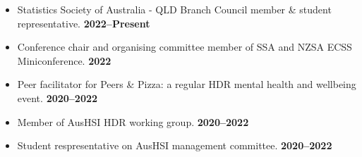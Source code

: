 \begin{itemize}
	\item Statistics Society of Australia - QLD Branch Council member \& student representative. \hfill\textbf{2022--Present}
	\item Conference chair and organising committee member of SSA and NZSA ECSS Miniconference. \hfill\textbf{2022}
	\item Peer facilitator for Peers \& Pizza: a regular HDR mental health and wellbeing event. \hfill\textbf{2020--2022}
	\item Member of AusHSI HDR working group. \hfill\textbf{2020--2022}
	\item Student respresentative on AusHSI management committee. \hfill\textbf{2020--2022}
\end{itemize}\par